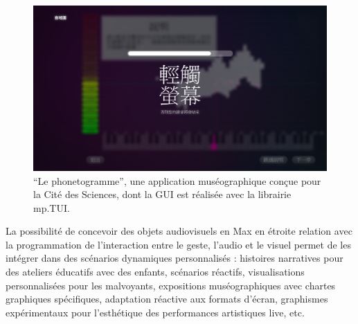\begin{figure}[!htbp]
	\includegraphics[width=\textwidth]{gfx/06_visual_representation/Phonetogramme.png}
	\caption{``Le phonetogramme'', une application muséographique conçue pour la Cité des Sciences, dont la GUI est réalisée avec la librairie mp.TUI.}
	\label{fig:visual_representation:phonetogramme}
\end{figure}

La possibilité de concevoir des objets audiovisuels en Max en étroite relation avec la programmation de l'interaction entre le geste, l'audio et le visuel permet de les intégrer dans des scénarios dynamiques personnalisés : histoires narratives pour des ateliers éducatifs avec des enfants, scénarios réactifs, visualisations personnalisées pour les malvoyants, expositions muséographiques avec chartes graphiques spécifiques, adaptation réactive aux formats d'écran, graphismes expérimentaux pour l'esthétique des performances artistiques live, etc.


